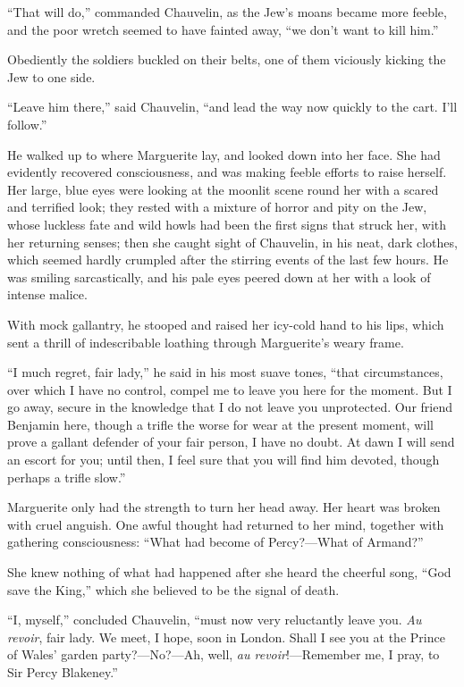 \documentclass[paper=a5,BCOR=7mm,twoside,DIV=calc,12pt,usegeometry,chapterprefix,endperiod,headings=big]{scrbook}
\begin{document}
\enquote{That will do,} commanded Chauvelin, as the Jew's moans became more feeble, and the poor wretch seemed to have fainted away, \enquote{we don't want to kill him.}

Obediently the soldiers buckled on their belts, one of them viciously kicking the Jew to one side.

\enquote{Leave him there,} said Chauvelin, \enquote{and lead the way now quickly to the cart. I'll follow.}

He walked up to where Marguerite lay, and looked down into her face. She had evidently recovered consciousness, and was making feeble efforts to raise herself. Her large, blue eyes were looking at the moonlit scene round her with a scared and terrified look; they rested with a mixture of horror and pity on the Jew, whose luckless fate and wild howls had been the first signs that struck her, with her returning senses; then she caught sight of Chauvelin, in his neat, dark clothes, which seemed hardly crumpled after the stirring events of the last few hours. He was smiling sarcastically, and his pale eyes peered down at her with a look of intense malice.

With mock gallantry, he stooped and raised her icy-cold hand to his lips, which sent a thrill of indescribable loathing through Marguerite's weary frame.

\enquote{I much regret, fair lady,} he said in his most suave tones, \enquote{that circumstances, over which I have no control, compel me to leave you here for the moment. But I go away, secure in the knowledge that I do not leave you unprotected. Our friend Benjamin here, though a trifle the worse for wear at the present moment, will prove a gallant defender of your fair person, I have no doubt. At dawn I will send an escort for you; until then, I feel sure that you will find him devoted, though perhaps a trifle slow.}

Marguerite only had the strength to turn her head away. Her heart was broken with cruel anguish. One awful thought had returned to her mind, together with gathering consciousness: \enquote{What had become of Percy?---What of Armand?}

She knew nothing of what had happened after she heard the cheerful song, \enquote{God save the King,} which she believed to be the signal of death.

\enquote{I, myself,} concluded Chauvelin, \enquote{must now very reluctantly leave you. \textit{Au revoir}, fair lady. We meet, I hope, soon in London. Shall I see you at the Prince of Wales’ garden party?---No?---Ah, well, \textit{au revoir}!---Remember me, I pray, to Sir Percy Blakeney.}
\end{document}
